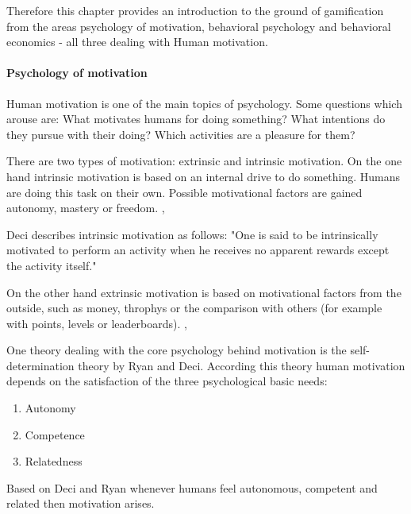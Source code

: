 Therefore this chapter provides an introduction to the ground of gamification from the areas psychology of motivation, behavioral psychology and behavioral economics - all three dealing with Human motivation.

\paragraph*{Psychology of motivation}
Human motivation is one of the main topics of psychology. Some questions which arouse are: What motivates humans for doing something? What intentions do they pursue with their doing? Which activities are a pleasure for them? \cite[p. 1]{bierhoffeditorEnzyklopaediePsychologieSoziale2016}

There are two types of motivation: extrinsic and intrinsic motivation. 
On the one hand intrinsic motivation is based on an internal drive to do something. Humans are doing this task on their own. Possible motivational factors are gained autonomy, mastery or freedom. \cite[p. 2, 3, 4]{bierhoffeditorEnzyklopaediePsychologieSoziale2016}, \cite[p. 60, 61]{kumarGamificationWorkDesigning2013}

Deci describes intrinsic motivation as follows: "One is said to be intrinsically motivated to perform an activity when he receives no apparent rewards except the activity itself." \cite[p. 105]{deciEffectsExternallyMediated1971}

On the other hand extrinsic motivation is based on motivational factors from the outside, such as money, throphys or the comparison with others (for example with points, levels or leaderboards). \cite[p. 2, 3, 4]{bierhoffeditorEnzyklopaediePsychologieSoziale2016}, \cite[p. 60, 61]{kumarGamificationWorkDesigning2013}

\label{selfDeterminationTheory}
One theory dealing with the core psychology behind motivation is the self-determination theory by Ryan and Deci. According this theory human motivation depends on the satisfaction of the three psychological basic needs: 
\begin{enumerate}
	\item Autonomy
	\item Competence
	\item Relatedness
\end{enumerate} 
Based on Deci and Ryan whenever humans feel autonomous, competent and related then motivation arises. \cite[p. 416-432]{deciTheoriesSocialPsychology2019}

